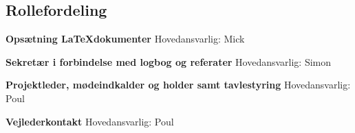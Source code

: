 \subsection{Rollefordeling}

\textbf{Opsætning \LaTeX dokumenter} \newline
Hovedansvarlig: Mick 

\textbf{Sekretær i forbindelse med logbog og referater} \newline
Hovedansvarlig: Simon

\textbf{Projektleder, mødeindkalder og holder samt tavlestyring } \newline
Hovedansvarlig: Poul

\textbf{Vejlederkontakt} \newline
Hovedansvarlig: Poul   
